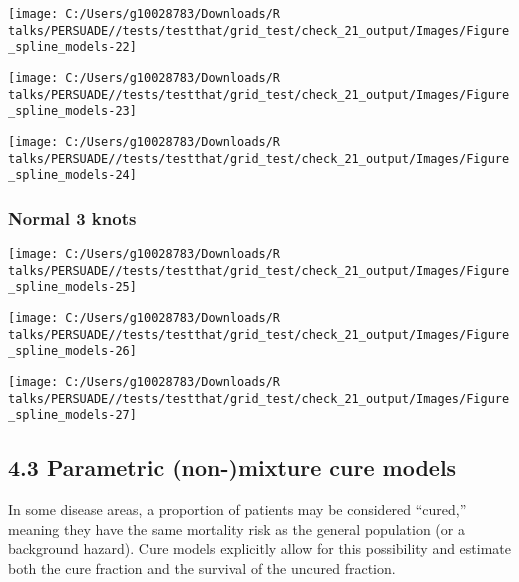 \documentclass[
]{article}
\begin{document}
\begin{flushleft}\texttt{[image: C:/Users/g10028783/Downloads/R talks/PERSUADE//tests/testthat/grid\_test/check\_21\_output/Images/Figure\_spline\_models-22]} \end{flushleft}

\begin{flushleft}\texttt{[image: C:/Users/g10028783/Downloads/R talks/PERSUADE//tests/testthat/grid\_test/check\_21\_output/Images/Figure\_spline\_models-23]} \end{flushleft}

\begin{flushleft}\texttt{[image: C:/Users/g10028783/Downloads/R talks/PERSUADE//tests/testthat/grid\_test/check\_21\_output/Images/Figure\_spline\_models-24]} \end{flushleft}

\clearpage

\subsubsection{Normal 3 knots}\label{normal-3-knots}

\begin{flushleft}\texttt{[image: C:/Users/g10028783/Downloads/R talks/PERSUADE//tests/testthat/grid\_test/check\_21\_output/Images/Figure\_spline\_models-25]} \end{flushleft}

\begin{flushleft}\texttt{[image: C:/Users/g10028783/Downloads/R talks/PERSUADE//tests/testthat/grid\_test/check\_21\_output/Images/Figure\_spline\_models-26]} \end{flushleft}

\begin{flushleft}\texttt{[image: C:/Users/g10028783/Downloads/R talks/PERSUADE//tests/testthat/grid\_test/check\_21\_output/Images/Figure\_spline\_models-27]} \end{flushleft}

\clearpage

\subsection{4.3 Parametric (non-)mixture cure
models}\label{parametric-non-mixture-cure-models}

In some disease areas, a proportion of patients may be considered
``cured,'' meaning they have the same mortality risk as the general
population (or a background hazard). Cure models explicitly allow for
this possibility and estimate both the cure fraction and the survival of
the uncured fraction.
\end{document}
